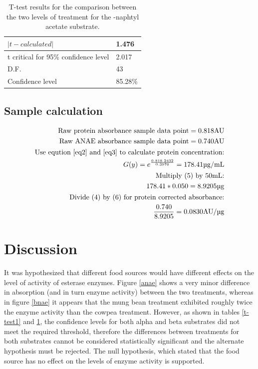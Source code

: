 \documentclass[12pt]{article}
\begin{document}
	\begin{table}[h]
		\centering
		\begin{tabular}{|l|l|} \hline
			$|t-calculated|$ & 1.476 \\ \hline
			t critical for 95\% confidence level & 2.017 \\ \hline
			D.F. & 43 \\ \hline
			Confidence level & 85.28\% \\ \hline
		\end{tabular}
		\caption{T-test results for the comparison between the two levels of treatment for the \textalpha-naphtyl acetate substrate.}
		\label{t-test2}
	\end{table}
\subsection{Sample calculation}
\begin{align}
\mathrm{\text{Raw protein absorbance sample data point}} = 0.818 \si{AU}\label{eq3}\\
\mathrm{\text{Raw ANAE absorbance sample data point}} = 0.740 \si{AU}\label{eq4}\\
\begin{aligned}
	\mathrm{\text{Use eqution \ref{eq2} and \ref{eq3} to calculate protein concentration:}}\\
		G(y)=e^{\frac{0.818.2432}{0.3976}}=178.41 \si{\micro\gram\per\milli\liter}
\end{aligned}\\
\begin{aligned}
	\mathrm{\text{Multiply (5) by 50\si{\milli\liter}:}}\\
	178.41*0.050=8.9205\si{\micro\gram}	
\end{aligned}\\
\begin{aligned}
	\mathrm{\text{Divide (4) by (6) for protein corrected absorbance:}}\\
	\frac{0.740}{8.9205}=0.0830
	\si{AU\per\micro\gram}	
\end{aligned}
\end{align}

\section{Discussion}
It was hypothesized that different food sources would have different effects on the level of activity of esterase enzymes. Figure \ref{anae} shows a very minor difference in absorption (and in turn enzyme activity) between the two treatments, whereas in figure \ref{bnae} it appears that the mung bean treatment exhibited roughly twice the enzyme activity than the cowpea treatment. However, as shown in tables \ref{t-test1} and \ref{t-test2}, the confidence levels for both alpha and beta substrates did not meet the required threshold, therefore the differences between treatments for both substrates cannot be considered statistically significant and the alternate hypothesis must be rejected. The null hypothesis, which stated that the food source has no effect on the levels of enzyme activity is supported. 
\end{document}
